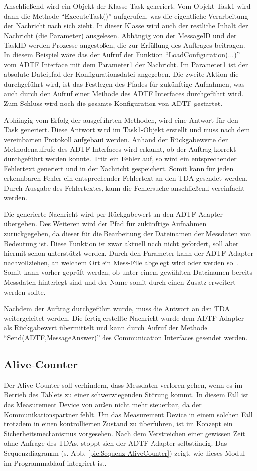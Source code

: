 \documentclass[12pt,a4paper]{report}
\begin{document}
Anschlie\ss end wird ein Objekt der Klasse Task generiert. Vom Objekt Task1 wird dann die Methode "`ExecuteTask()"' aufgerufen, was die eigentliche Verarbeitung der Nachricht nach sich zieht. In dieser Klasse wird auch der restliche Inhalt der Nachricht (die Parameter) ausgelesen. Abhängig von der MessageID und der TaskID werden Prozesse angesto\ss en, die zur Erfüllung des Auftrages beitragen. In diesem Beispiel wäre das der Aufruf der Funktion "`LoadConfiguration(...)"' vom ADTF Interface mit dem Parameter1 der Nachricht. Im Parameter1 ist der absolute Dateipfad der Konfigurationsdatei angegeben. Die zweite Aktion die durchgeführt wird, ist das Festlegen des Pfades für zukünftige Aufnahmen, was auch durch den Aufruf einer Methode des ADTF Interfaces durchgeführt wird. Zum Schluss wird noch die gesamte Konfiguration von ADTF gestartet. 

Abhängig vom Erfolg der ausgeführten Methoden, wird eine Antwort für den Task generiert. Diese Antwort wird im Task1-Objekt erstellt und muss nach dem vereinbarten Protokoll aufgebaut werden. Anhand der Rückgabewerte der Methodenaufrufe des ADTF Interfaces wird erkannt, ob der Auftrag korrekt durchgeführt werden konnte. Tritt ein Fehler auf, so wird ein entsprechender Fehlertext generiert und in der Nachricht gespeichert. Somit kann für jeden erkennbaren Fehler ein entsprechender Fehlertext an den TDA gesendet werden. Durch Ausgabe des Fehlertextes, kann die Fehlersuche anschließend vereinfacht werden.

Die generierte Nachricht wird per Rückgabewert an den ADTF Adapter übergeben. Des Weiteren wird der Pfad für zukünftige Aufnahmen zurückgegeben, da dieser für die Bearbeitung der Dateinamen der Messdaten von Bedeutung ist. Diese Funktion ist zwar aktuell noch nicht gefordert, soll aber hiermit schon unterstützt werden. Durch den Parameter kann der ADTF Adapter nachvollziehen, an welchem Ort ein Mess-File abgelegt wird oder werden soll. Somit kann vorher geprüft werden, ob unter einem gewählten Dateinamen bereits Messdaten hinterlegt sind und der Name somit durch einen Zusatz erweitert werden sollte.

Nachdem der Auftrag durchgeführt wurde, muss die Antwort an den TDA weitergeleitet werden. Die fertig erstellte Nachricht wurde dem ADTF Adapter als Rückgabewert übermittelt und kann durch Aufruf der Methode "`Send(ADTF,MessageAnswer)"' des Communication Interfaces gesendet werden.
\subsection{Alive-Counter}\label{subsec:Alive-Counter}
Der Alive-Counter soll verhindern, dass Messdaten verloren gehen, wenn es im Betrieb des Tablets zu einer schwerwiegenden Störung kommt. In diesem Fall ist das Measurement Device von außen nicht mehr steuerbar, da der Kommunikationspartner fehlt. Um das Measurement Device in einem solchen Fall trotzdem in einen kontrollierten Zustand zu überführen, ist im Konzept ein Sicherheitsmechanismus vorgesehen. Nach dem Verstreichen einer gewissen Zeit ohne Anfrage des TDAs, stoppt sich der ADTF Adapter selbständig. Das Sequenzdiagramm (s. Abb. \ref{pic:Sequenz AliveCounter}) zeigt, wie dieses Modul im Programmablauf integriert ist.
\end{document}
